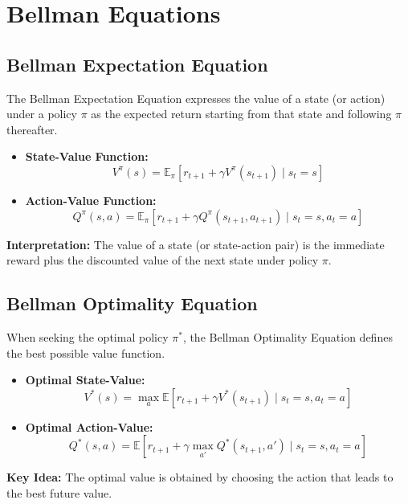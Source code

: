 \documentclass[12pt]{article}
\begin{document}
\section{Bellman Equations}

\subsection{Bellman Expectation Equation}

The Bellman Expectation Equation expresses the value of a state (or action) under a policy $\pi$ as the expected return starting from that state and following $\pi$ thereafter.

\begin{itemize}
    \item \textbf{State-Value Function:}
    \[
    V^{\pi}(s) = \mathbb{E}_{\pi} \left[ r_{t+1} + \gamma V^{\pi}(s_{t+1}) \mid s_t = s \right]
    \]
    
    \item \textbf{Action-Value Function:}
    \[
    Q^{\pi}(s, a) = \mathbb{E}_{\pi} \left[ r_{t+1} + \gamma Q^{\pi}(s_{t+1}, a_{t+1}) \mid s_t = s, a_t = a \right]
    \]
\end{itemize}

\textbf{Interpretation:}  
The value of a state (or state-action pair) is the immediate reward plus the discounted value of the next state under policy $\pi$.

\subsection{Bellman Optimality Equation}

When seeking the optimal policy $\pi^*$, the Bellman Optimality Equation defines the best possible value function.

\begin{itemize}
    \item \textbf{Optimal State-Value:}
    \[
    V^*(s) = \max_{a} \mathbb{E} \left[ r_{t+1} + \gamma V^*(s_{t+1}) \mid s_t = s, a_t = a \right]
    \]
    
    \item \textbf{Optimal Action-Value:}
    \[
    Q^*(s, a) = \mathbb{E} \left[ r_{t+1} + \gamma \max_{a'} Q^*(s_{t+1}, a') \mid s_t = s, a_t = a \right]
    \]
\end{itemize}

\textbf{Key Idea:}  
The optimal value is obtained by choosing the action that leads to the best future value.
\end{document}
